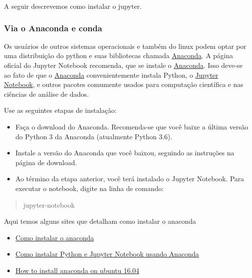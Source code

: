\documentclass[11pt]{article}
\providecommand{\tightlist}{%
      \setlength{\itemsep}{0pt}\setlength{\parskip}{0pt}}
\begin{document}
A seguir descrevemos como instalar o jupyter.

\subsubsection{Via o Anaconda e conda }\label{via-o-anaconda-e-conda}

Os usuários de outros sistemas operacionais e também do linux podem
optar por uma distribuição do python e suas bibliotecas chamada
\href{https://www.continuum.io/}{Anaconda}. A página oficial do Jupyter
Notebook recomenda, que se instale o
\href{https://www.continuum.io/downloads}{Anaconda}. Isso deve-se ao
fato de que o \href{https://www.continuum.io/}{Anaconda}
convenientemente instala Python, o \href{http://jupyter.org/}{Jupyter
Notebook}, e outros pacotes comumente usados para computação científica
e nas ciências de análise de dados.

Use as seguintes etapas de instalação:

\begin{itemize}
\tightlist
\item
  Faça o download do Anaconda. Recomenda-se que você baixe a última
  versão do Python 3 da Anaconda (atualmente Python 3.6).
\item
  Instale a versão do Anaconda que você baixou, seguindo as instruções
  na página de download.
\item
  Ao término da etapa anterior, você terá instalado o Jupyter Notebook.
  Para executar o notebook, digite na linha de comando:
\end{itemize}

\begin{quote}
jupyter-notebook
\end{quote}

Aqui temos alguns sites que detalham como instalar o anaconda

\begin{itemize}
\tightlist
\item
  \href{https://programandociencia.com/2015/08/07/instalando-o-anaconda/}{Como
  instalar o anaconda}
\item
  \href{https://paulovasconcellos.com.br/como-baixar-anaconda-31fd49c19bd8}{Como
  instalar Python e Jupyter Notebook usando Anaconda}
\item
  \href{https://www.digitalocean.com/community/tutorials/how-to-install-the-anaconda-python-distribution-on-ubuntu-16-04}{How
  to install anaconda on ubuntu 16.04}
\end{itemize}
\end{document}
